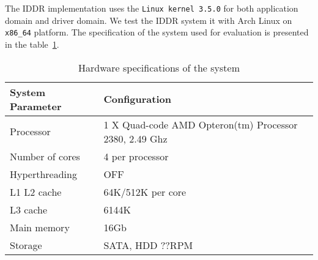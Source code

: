 The IDDR implementation uses the \texttt{Linux kernel 3.5.0} for both application domain and driver domain. We test the IDDR system it with Arch Linux on \texttt{x86\_64} platform. The specification of the system used for evaluation is presented in the table~\ref{tab:config}. 

\begin{table}
\caption{Hardware specifications of the system}
\begin{center}
\begin{tabular}{ll}
  \hline
  \label{tab:config}
  System Parameter & Configuration \\
  \hline
  Processor & 1 X Quad-code AMD Opteron(tm) Processor 2380, 2.49 Ghz \\
  Number of cores & 4 per processor \\
  Hyperthreading & OFF \\
  L1 L2 cache & 64K/512K per core \\
  L3 cache & 6144K \\
  Main memory & 16Gb \\
  Storage & SATA, HDD ??RPM \\
  \hline 
\end{tabular}
\end{center}
\end{table}

